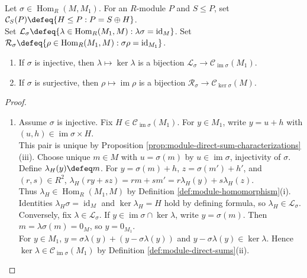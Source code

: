 \begin{theorem} \label{thm:module-one-sided-inverses-and-complements} \\
Let $\sigma\in\operatorname{Hom}_R(M,M_1)$. For an $R$-module $P$ and $S\leq P$, set $\mathcal{C}_S(P)\defeq\{H\leq P:P=S\oplus H\}$.\\
Set $\mathcal{L}_\sigma\defeq\{\lambda\in\operatorname{Hom}_R(M_1,M):\lambda\sigma=\operatorname{id}_M\}$. Set $\mathcal{R}_\sigma\defeq\{\rho\in\operatorname{Hom}_R(M_1,M):\sigma\rho=\operatorname{id}_{M_1}\}$.
\begin{enumerate}[label=(\roman*)]
\setlength{\itemsep}{0pt}
\item If $\sigma$ is injective, then $\lambda\mapsto\ker\lambda$ is a bijection $\mathcal{L}_\sigma\to\mathcal{C}_{\operatorname{im}\sigma}(M_1)$.
\item If $\sigma$ is surjective, then $\rho\mapsto\operatorname{im}\rho$ is a bijection $\mathcal{R}_\sigma\to\mathcal{C}_{\ker\sigma}(M)$.
\end{enumerate}
\begin{proof}
\begin{enumerate}[label=(\roman*)]
\setlength{\itemsep}{0pt}
\item Assume $\sigma$ is injective. Fix $H\in\mathcal{C}_{\operatorname{im}\sigma}(M_1)$. For $y\in M_1$, write $y=u+h$ with $(u,h)\in\operatorname{im}\sigma\times H$.\\
This pair is unique by Proposition \ref{prop:module-direct-sum-characterizations}(iii). Choose unique $m\in M$ with $u=\sigma(m)$ by $u\in\operatorname{im}\sigma$, injectivity of $\sigma$.\\
Define $\lambda_H(y)\defeq m$. For $y=\sigma(m)+h$, $z=\sigma(m')+h'$, and $(r,s)\in R^2$, $\lambda_H(ry+sz)=rm+sm'=r\lambda_H(y)+s\lambda_H(z)$.\\
Thus $\lambda_H\in\operatorname{Hom}_R(M_1,M)$ by Definition \ref{def:module-homomorphism}(i). Identities $\lambda_H\sigma=\operatorname{id}_M$ and $\ker\lambda_H=H$ hold by defining formula, so $\lambda_H\in\mathcal{L}_\sigma$.\\
Conversely, fix $\lambda\in\mathcal{L}_\sigma$. If $y\in\operatorname{im}\sigma\cap\ker\lambda$, write $y=\sigma(m)$. Then $m=\lambda\sigma(m)=0_M$, so $y=0_{M_1}$.\\
For $y\in M_1$, $y=\sigma\lambda(y)+(y-\sigma\lambda(y))$ and $y-\sigma\lambda(y)\in\ker\lambda$. Hence $\ker\lambda\in\mathcal{C}_{\operatorname{im}\sigma}(M_1)$ by Definition \ref{def:module-direct-sums}(ii).\\

\end{enumerate}
\end{proof}
\end{theorem}
